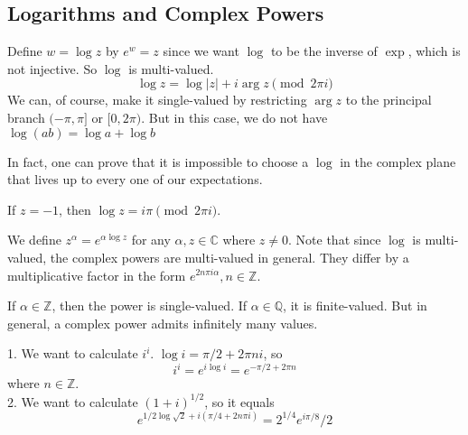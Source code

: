 \subsection{Logarithms and Complex Powers}
\begin{definition}
    Define $w=\log z$ by $e^w=z$ since we want $\log$ to be the inverse of $\exp$, which is not injective.
    So $\log$ is multi-valued.
    $$\log z=\log|z|+i\arg z\pmod{2\pi i}$$
    We can, of course, make it single-valued by restricting $\arg z$ to the principal branch $(-\pi,\pi]$ or $[0,2\pi)$.
    But in this case, we do not have $\log(ab)=\log a+\log b$
\end{definition}
In fact, one can prove that it is impossible to choose a $\log$ in the complex plane that lives up to every one of our expectations.
\begin{example}
    If $z=-1$, then $\log z=i\pi\pmod{2\pi i}$.
\end{example}
\begin{definition}
    We define $z^\alpha=e^{\alpha\log z}$ for any $\alpha, z\in\mathbb C$ where $z\neq 0$.
    Note that since $\log$ is multi-valued, the complex powers are multi-valued in general.
    They differ by a multiplicative factor in the form $e^{2n\pi i\alpha},n\in\mathbb Z$.
\end{definition}
If $\alpha\in\mathbb Z$, then the power is single-valued.
If $\alpha\in\mathbb Q$, it is finite-valued.
But in general, a complex power admits infinitely many values.
\begin{example}
    1. We want to calculate $i^i$. $\log i=\pi/2+2\pi ni$, so
    $$i^i=e^{i\log i}=e^{-\pi/2+2\pi n}$$
    where $n\in\mathbb Z$.\\
    2. We want to calculate $(1+i)^{1/2}$, so it equals
    $$e^{1/2\log\sqrt 2+i(\pi/4+2n\pi i)}=2^{1/4}e^{i\pi/8}/2$$
\end{example}
